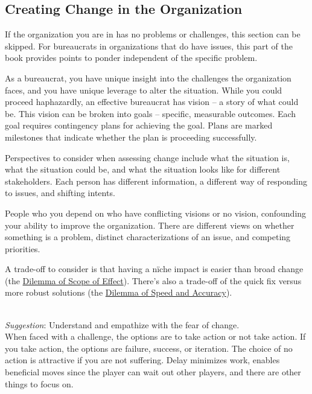 \subsection*{Creating Change in the Organization\label{sec:creating-change}}

If the organization you are in has no problems or challenges, this section can be skipped. For bureaucrats in organizations that do have issues, this part of the book provides points to ponder independent of the specific problem.

As a bureaucrat, you have unique insight into the challenges the organization faces, and you have unique leverage to alter the situation.  While you could proceed haphazardly, an effective bureaucrat has vision -- a story of what could be. This vision can be broken into goals -- specific, measurable outcomes. Each goal requires contingency plans for achieving the goal. Plans are marked milestones that indicate whether the plan is proceeding successfully. 

Perspectives to consider when assessing change include what the situation is, what the situation could be, and what the situation looks like for different stakeholders. Each person has different information, a different way of responding to issues, and shifting intents.

People who you depend on who have conflicting visions or no vision, confounding your ability to improve the organization. There are different views on whether something is a problem, distinct characterizations of an issue, and competing priorities.

A trade-off to consider is that having a n\"iche impact is easier than broad change (the \hyperref[table:dilemma-personal-scope-broad-vs-narrow]{Dilemma of Scope of Effect}). 
%
There's also a trade-off of the quick fix versus more robust solutions (the \hyperref[table:dilemma-personal-quick-methodical]{Dilemma of Speed and Accuracy}).




\ \\
\textit{Suggestion}: Understand and empathize with the fear of change. \\
When faced with a challenge, the options are to take action or not take action. If you take action, the options are failure, success, or iteration. 
The choice of no action is attractive if you are not suffering. Delay minimizes work, enables beneficial moves since the player can wait out other players, and there are other things to focus on.

